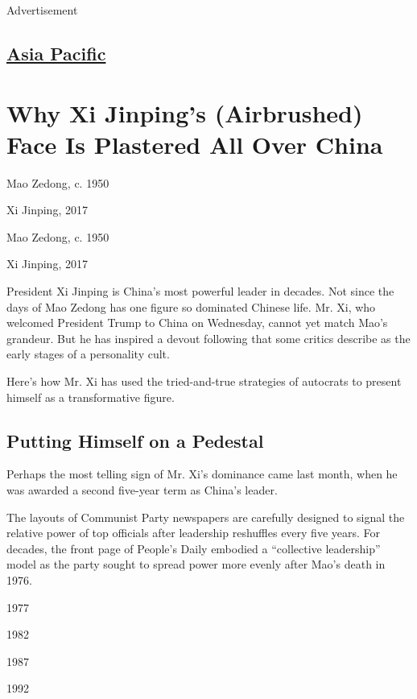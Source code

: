 Advertisement

\hypertarget{-asia-pacific-}{%
\subsection{\texorpdfstring{ \href{/section/world/asia}{Asia Pacific}
}{ Asia Pacific }}\label{-asia-pacific-}}

\hypertarget{why-xi-jinpings-airbrushed-face-is-plastered-all-over-china}{%
\section{Why Xi Jinping's (Airbrushed) Face Is Plastered All Over
China}\label{why-xi-jinpings-airbrushed-face-is-plastered-all-over-china}}

Mao Zedong, c. 1950

Xi Jinping, 2017

Mao Zedong, c. 1950

Xi Jinping, 2017

President Xi Jinping is China's most powerful leader in decades. Not
since the days of Mao Zedong has one figure so dominated Chinese life.
Mr. Xi, who welcomed President Trump to China on Wednesday, cannot yet
match Mao's grandeur. But he has inspired a devout following that some
critics describe as the early stages of a personality cult.

Here's how Mr. Xi has used the tried-and-true strategies of autocrats to
present himself as a transformative figure.

\hypertarget{putting-himself-on-a-pedestal}{%
\subsection{Putting Himself on a
Pedestal}\label{putting-himself-on-a-pedestal}}

Perhaps the most telling sign of Mr. Xi's dominance came last month,
when he was awarded a second five-year term as China's leader.

The layouts of Communist Party newspapers are carefully designed to
signal the relative power of top officials after leadership reshuffles
every five years. For decades, the front page of People's Daily embodied
a ``collective leadership'' model as the party sought to spread power
more evenly after Mao's death in 1976.

1977

1982

1987

1992

